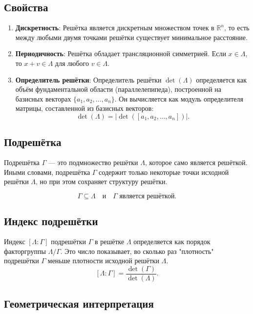 \documentclass[12pt]{article}
\begin{document}
\subsection*{Свойства}
\begin{enumerate}
    \item \textbf{Дискретность}: Решётка является дискретным множеством точек в $\mathbb{R}^n$, то есть между любыми двумя точками решётки существует минимальное расстояние.
    \item \textbf{Периодичность}: Решётка обладает трансляционной симметрией. Если $x \in \Lambda$, то $x + v \in \Lambda$ для любого $v \in \Lambda$.
    \item \textbf{Определитель решётки}: Определитель решётки $\det(\Lambda)$ определяется как объём фундаментальной области (параллелепипеда), построенной на базисных векторах $\{a_1, a_2, \dots, a_n\}$. Он вычисляется как модуль определителя матрицы, составленной из базисных векторов:
    $$
    \det(\Lambda) = |\det([a_1, a_2, \dots, a_n])|.
    $$
\end{enumerate}



\subsection{Подрешётка}

\begin{definition}
Подрешётка $\Gamma$ — это подмножество решётки $\Lambda$, которое само является решёткой. Иными словами, подрешётка $\Gamma$ содержит только некоторые точки исходной решётки $\Lambda$, но при этом сохраняет структуру решётки.

$$
\Gamma \subseteq \Lambda \quad \text{и} \quad \Gamma \text{ является решёткой}.
$$
\end{definition}

\subsection*{Индекс подрешётки}
Индекс $[\Lambda : \Gamma]$ подрешётки $\Gamma$ в решётке $\Lambda$ определяется как порядок факторгруппы $\Lambda / \Gamma$. Это число показывает, во сколько раз "плотность" подрешётки $\Gamma$ меньше плотности исходной решётки $\Lambda$. 
$$
[\Lambda : \Gamma] = \frac{\det(\Gamma)}{\det(\Lambda)}.
$$



\subsection{Геометрическая интерпретация}
\end{document}
